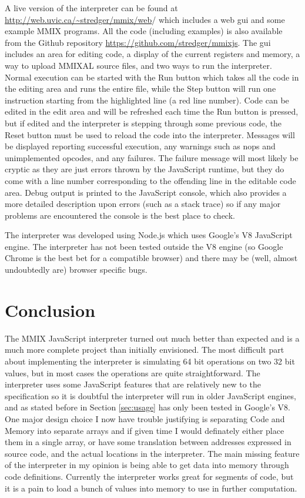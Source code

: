 \documentclass[conference]{IEEEtran}
\begin{document}
A live version of the interpreter can be found at \url{http://web.uvic.ca/~stredger/mmix/web}/ which includes a web gui and some example MMIX programs. All the code (including examples) is also available from the Github repository \url{https://github.com/stredger/mmixjs}. The gui includes an area for editing code, a display of the current registers and memory, a way to upload MMIXAL source files, and two ways to run the interpreter. Normal execution can be started with the Run button which takes all the code in the editing area and runs the entire file, while the Step button will run one instruction starting from the highlighted line (a red line number). Code can be edited in the edit area and will be refreshed each time the Run button is pressed, but if edited and the interpreter is stepping through some previous code, the Reset button must be used to reload the code into the interpreter. Messages will be displayed reporting successful execution, any warnings such as nops and unimplemented opcodes, and any failures. The failure message will most likely be cryptic as they are just errors thrown by the JavaScript runtime, but they do come with a line number corresponding to the offending line in the editable code area. Debug output is printed to the JavaScript console, which also provides a more detailed description upon errors (such as a stack trace) so if any major problems are encountered the console is the best place to check. 

The interpreter was developed using Node.js which uses Google’s V8 JavaScript engine. The interpreter has not been tested outside the V8 engine (so Google Chrome is the best bet for a compatible browser) and there may be (well, almost undoubtedly are) browser specific bugs.


\vspace{0.5cm}
\section{Conclusion}

The MMIX JavaScript interpreter turned out much better than expected and is a much more complete project than initially envisioned. The most difficult part about implementing the interpreter is simulating 64 bit operations on two 32 bit values, but in most cases the operations are quite straightforward. The interpreter uses some JavaScript features that are relatively new to the specification so it is doubtful the interpreter will run in older JavaScript engines, and as stated before in Section \ref{sec:usage} has only been tested in Google’s V8. One major design choice I now have trouble justifying is separating Code and Memory into separate arrays and if given time I would definately either place them in a single array, or have some translation between addresses expressed in source code, and the actual locations in the interpreter. The main missing feature of the interpreter in my opinion is being able to get data into memory through code definitions. Currently the interpreter works great for segments of code, but it is a pain to load a bunch of values into memory to use in further computation.
\end{document}
